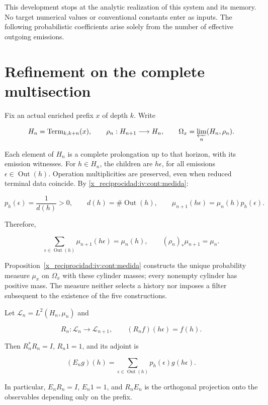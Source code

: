This development stops at the analytic realization of this system and its memory. No target numerical values or conventional constants enter as inputs. The following probabilistic coefficients arise solely from the number of effective outgoing emissions.

\section{Refinement on the complete multisection}

Fix an actual enriched prefix \(x\) of depth \(k\). Write

\[
H_n=\operatorname{Term}_{k,k+n}(x),\qquad
\rho_n:H_{n+1}\longrightarrow H_n,
\qquad \Omega_x=\varprojlim_n(H_n,\rho_n).
\]

Each element of \(H_n\) is a complete prolongation up to that horizon, with its emission witnesses. For \(h\in H_n\), the children are \(h\epsilon\), for all emissions \(\epsilon\in\operatorname{Out}(h)\). Operation multiplicities are preserved, even when reduced terminal data coincide. By \cref{x_reciprocidad:iv:cont:medida}:

\[
p_h(\epsilon)=\frac1{d(h)}>0,\qquad
d(h)=\#\operatorname{Out}(h),\qquad
\mu_{n+1}(h\epsilon)=\mu_n(h)p_h(\epsilon).
\]

Therefore,

\begin{equation}
\sum_{\epsilon\in\operatorname{Out}(h)}\mu_{n+1}(h\epsilon)=\mu_n(h),
\qquad (\rho_n)_*\mu_{n+1}=\mu_n.
\label{x_reciprocidad:nuc01:eq:1}
\end{equation}

Proposition~\ref{x_reciprocidad:iv:cont:medida} constructs the unique probability measure \(\mu_x\) on \(\Omega_x\) with these cylinder masses; every nonempty cylinder has positive mass. The measure neither selects a history nor imposes a filter subsequent to the existence of the five constructions.

\begin{proposition}
\label{x_reciprocidad:nuc01:pullback}

Let \(\mathscr L_n=L^2(H_n,\mu_n)\) and

\[
R_n:\mathscr L_n\longrightarrow\mathscr L_{n+1},\qquad
(R_nf)(h\epsilon)=f(h).
\]

Then \(R_n^*R_n=I\), \(R_n1=1\), and its adjoint is

\begin{equation}
(E_ng)(h)=\sum_{\epsilon\in\operatorname{Out}(h)}p_h(\epsilon)g(h\epsilon).
\label{x_reciprocidad:nuc01:eq:2}
\end{equation}

In particular, \(E_nR_n=I\), \(E_n1=1\), and \(R_nE_n\) is the orthogonal projection onto the observables depending only on the prefix.
\end{proposition}

